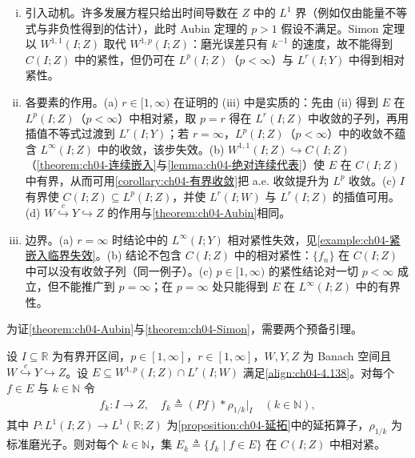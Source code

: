 \documentclass[../../main.tex]{subfiles}%
\begin{document}
\begin{remark}\label{remark:ch04-Simon动机}
\begin{enumerate}[(i)]
\item 引入动机。许多发展方程只给出时间导数在 $Z$ 中的 $L^1$ 界（例如仅由能量不等式与非负性得到的估计），此时 Aubin 定理的 $p>1$ 假设不满足。Simon 定理以 $W^{1,1}(I;Z)$ 取代 $W^{1,p}(I;Z)$：磨光误差只有 $k^{-1}$ 的速度，故不能得到 $C(I;Z)$ 中的紧性，但仍可在 $L^p(I;Z)$（$p<\infty$）与 $L^r(I;Y)$ 中得到相对紧性。

\item 各要素的作用。(a) $r\in[1,\infty)$ 在证明的 (iii) 中是实质的：先由 (ii) 得到 $E$ 在 $L^p(I;Z)$（$p<\infty$）中相对紧，取 $p=r$ 得在 $L^r(I;Z)$ 中收敛的子列，再用插值不等式过渡到 $L^r(I;Y)$；若 $r=\infty$，$L^p(I;Z)$（$p<\infty$）中的收敛不蕴含 $L^\infty(I;Z)$ 中的收敛，该步失效。(b) $W^{1,1}(I;Z)\hookrightarrow C(I;Z)$（\cref{theorem:ch04-连续嵌入}与\cref{lemma:ch04-绝对连续代表}）使 $E$ 在 $C(I;Z)$ 中有界，从而可用\cref{corollary:ch04-有界收敛}把 a.e. 收敛提升为 $L^p$ 收敛。(c) $I$ 有界使 $C(I;Z)\subseteq L^p(I;Z)$，并使 $L^r(I;W)$ 与 $L^r(I;Z)$ 的插值可用。(d) $W\overset{c}{\hookrightarrow}Y\hookrightarrow Z$ 的作用与\cref{theorem:ch04-Aubin}相同。

\item 边界。(a) $r=\infty$ 时结论中的 $L^\infty(I;Y)$ 相对紧性失效，见\cref{example:ch04-紧嵌入临界失效}。(b) 结论不包含 $C(I;Z)$ 中的相对紧性：$\{f_n\}$ 在 $C(I;Z)$ 中可以没有收敛子列（同一例子）。(c) $p\in[1,\infty)$ 的紧性结论对一切 $p<\infty$ 成立，但不能推广到 $p=\infty$；在 $p=\infty$ 处只能得到 $E$ 在 $L^\infty(I;Z)$ 中的有界性。
\end{enumerate}
\end{remark}

为证\cref{theorem:ch04-Aubin}与\cref{theorem:ch04-Simon}，需要两个预备引理。

\begin{lemma}\label{lemma:ch04-磨光紧}
设 $I\subseteq\mathbb{R}$ 为有界开区间，$p\in[1,\infty]$，$r\in[1,\infty]$，$W,Y,Z$ 为 Banach 空间且 $W\overset{c}{\hookrightarrow}Y\hookrightarrow Z$。设 $E\subseteq W^{1,p}(I;Z)\cap L^r(I;W)$ 满足\eqref{align:ch04-4.138}。对每个 $f\in E$ 与 $k\in\mathbb{N}$ 令
\begin{align*}
f_k:I\to Z,\quad f_k\triangleq (Pf)*\rho_{1/k}|_I\quad(k\in\mathbb{N}),
\end{align*}
其中 $P:L^1(I;Z)\to L^1(\mathbb{R};Z)$ 为\cref{proposition:ch04-延拓}中的延拓算子，$\rho_{1/k}$ 为标准磨光子。则对每个 $k\in\mathbb{N}$，集 $E_k\triangleq\{f_k\mid f\in E\}$ 在 $C(I;Z)$ 中相对紧。
\end{lemma}
\end{document}

